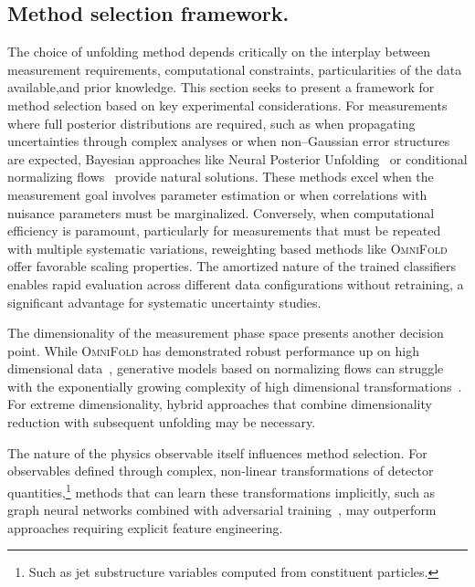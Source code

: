     \subsection{Method selection framework.}
        The choice of unfolding method depends critically on the interplay between measurement requirements, computational constraints, particularities of the data available,and prior knowledge.
        This section seeks to present a framework for method selection based on key experimental considerations.
        For measurements where full posterior distributions are required, such as when propagating uncertainties through complex analyses or when non--Gaussian error structures are expected, Bayesian approaches like Neural Posterior Unfolding~\cite{acosta2024npu} or conditional normalizing flows~\cite{Bellagente2020InvertibleAgain} provide natural solutions.
        These methods excel when the measurement goal involves parameter estimation or when correlations with nuisance parameters must be marginalized.
        Conversely, when computational efficiency is paramount, particularly for measurements that must be repeated with multiple systematic variations, reweighting based methods like \textsc{OmniFold}~\cite{andreassen_omnifold_2020} offer favorable scaling properties.
        The amortized nature of the trained classifiers enables rapid evaluation across different data configurations without retraining, a significant advantage for systematic uncertainty studies.

        The dimensionality of the measurement phase space presents another decision point.
        While \textsc{OmniFold} has demonstrated robust performance up on high dimensional data~\cite{andreassen_omnifold_2020}, generative models based on normalizing flows can struggle with the exponentially growing complexity of high dimensional transformations~\cite{papamakarios_masked_2018}.
        For extreme dimensionality, hybrid approaches that combine dimensionality reduction with subsequent unfolding may be necessary.

        The nature of the physics observable itself influences method selection.
        For observables defined through complex, non-linear transformations of detector quantities,\footnote{Such as jet substructure variables computed from constituent particles.} methods that can learn these transformations implicitly, such as graph neural networks combined with adversarial training~\cite{Shlomi2020GraphPhysics}, may outperform approaches requiring explicit feature engineering.

